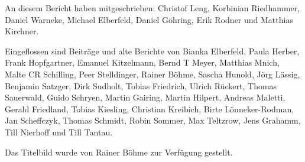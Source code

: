 \documentclass[a4paper]{scrreprt}
\begin{document}
\vfill

An diesem Bericht haben mitgeschrieben: Christof Leng, Korbinian
Riedhammer, Daniel Warneke, Michael Elberfeld, Daniel Göhring, Erik Rodner und Matthias Kirchner. 

Eingeflossen sind Beiträge und alte Berichte von Bianka Elberfeld,
Paula Herber, Frank Hopfgartner, Emanuel Kitzelmann, Bernd T Meyer,
Matthias Mnich, Malte CR Schilling, Peer Stelldinger, Rainer Böhme,
Sascha Hunold, Jörg Lässig, Benjamin Satzger, Dirk Sudholt, Tobias
Friedrich, Ulrich Rückert, Thomas Sauerwald, Guido Schryen, Martin
Gairing, Martin Hilpert, Andreas Maletti, Gerald Friedland, Tobias
Kiesling, Christian Kreibich, Birte Lönneker-Rodman, Jan Scheffczyk,
Thomas Schmidt, Robin Sommer, Max Teltzrow, Jens Grahamm, Till
Nierhoff und Till Tantau.

Das Titelbild wurde von Rainer Böhme zur Verfügung gestellt.
\end{document}
